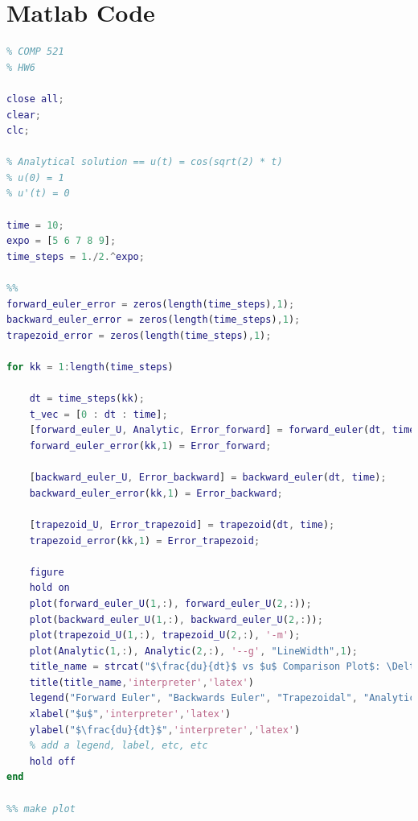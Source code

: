 \documentclass[12pt,letterpaper]{article}
\begin{document}
\clearpage
\section*{Matlab Code}
\begin{lstlisting}[language = Matlab]
%% Zack Humphries
% COMP 521
% HW6

close all;
clear;
clc;

% Analytical solution == u(t) = cos(sqrt(2) * t)
% u(0) = 1
% u'(t) = 0

time = 10;
expo = [5 6 7 8 9];
time_steps = 1./2.^expo;

%%
forward_euler_error = zeros(length(time_steps),1);
backward_euler_error = zeros(length(time_steps),1);
trapezoid_error = zeros(length(time_steps),1);

for kk = 1:length(time_steps)
    
    dt = time_steps(kk);
    t_vec = [0 : dt : time]; 
    [forward_euler_U, Analytic, Error_forward] = forward_euler(dt, time);
    forward_euler_error(kk,1) = Error_forward;

    [backward_euler_U, Error_backward] = backward_euler(dt, time);
    backward_euler_error(kk,1) = Error_backward;

    [trapezoid_U, Error_trapezoid] = trapezoid(dt, time);
    trapezoid_error(kk,1) = Error_trapezoid;

    figure
    hold on
    plot(forward_euler_U(1,:), forward_euler_U(2,:));
    plot(backward_euler_U(1,:), backward_euler_U(2,:));
    plot(trapezoid_U(1,:), trapezoid_U(2,:), '-m');
    plot(Analytic(1,:), Analytic(2,:), '--g', "LineWidth",1);
    title_name = strcat("$\frac{du}{dt}$ vs $u$ Comparison Plot$: \Delta t = \left(\frac{1}{2}\right)^{", sprintf("%i", expo(kk)), "}$");
    title(title_name,'interpreter','latex')
    legend("Forward Euler", "Backwards Euler", "Trapezoidal", "Analytic")
    xlabel("$u$",'interpreter','latex')
    ylabel("$\frac{du}{dt}$",'interpreter','latex')
    % add a legend, label, etc, etc
    hold off
end

%% make plot


\end{lstlisting}
\end{document}
